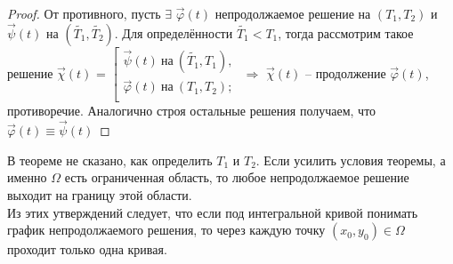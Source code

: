 \begin{proof}
	От противного, пусть $\exists$ $\vec{\varphi}(t)$ непродолжаемое решение на $(T_1, T_2)$ и $\vec{\psi}(t)$ на $(\widetilde{T_1}, \widetilde{T_2})$. Для определённости $\widetilde{T_1} < T_1$, тогда рассмотрим такое решение
	$\vec{\chi}(t)$ = 
	$\left[ 
		\begin{gathered} 
			\vec{\psi}(t)\ \text{на}\ (\widetilde{T_1}, T_1), \\ 
			\vec{\varphi}(t)\ \text{на}\ (T_1, T_2); \\ 
		\end{gathered} 
	\right.$
	$\Rightarrow$ $\vec{\chi}(t)$  -- продолжение $\vec{\varphi}(t)$, противоречие. Аналогично строя остальные решения получаем, что $\vec{\varphi}(t) \equiv \vec{\psi}(t)$ 
\end{proof}

\begin{remark}
	В теореме не сказано, как определить $T_1$ и $T_2$. Если усилить условия теоремы, а именно $\Omega$ есть ограниченная область, то любое непродолжаемое решение выходит на границу этой области.\\
	Из этих утверждений следует, что если под интегральной кривой понимать график непродолжаемого решения, то через каждую точку $(x_0, y_0) \in \Omega$ проходит только одна кривая.
\end{remark}

